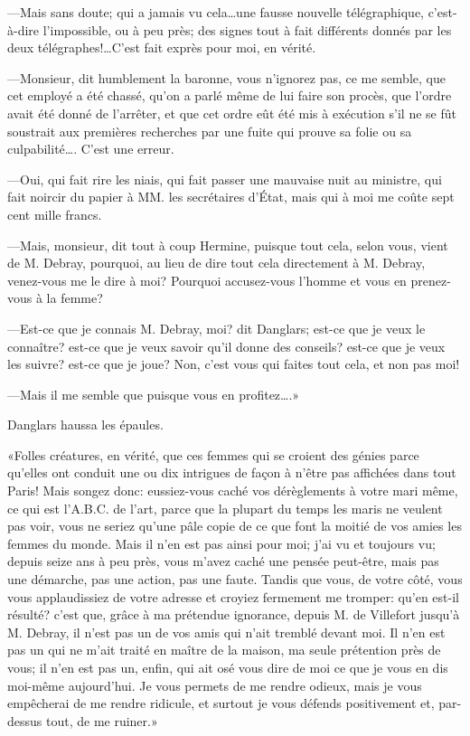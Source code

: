 —Mais sans doute; qui a jamais vu cela\dots une fausse nouvelle télégraphique, c'est-à-dire l'impossible, ou à peu près; des signes tout à fait différents donnés par les deux télégraphes!\dots C'est fait exprès pour moi, en vérité. 

—Monsieur, dit humblement la baronne, vous n'ignorez pas, ce me semble, que cet employé a été chassé, qu'on a parlé même de lui faire son procès, que l'ordre avait été donné de l'arrêter, et que cet ordre eût été mis à exécution s'il ne se fût soustrait aux premières recherches par une fuite qui prouve sa folie ou sa culpabilité\dots. C'est une erreur. 

—Oui, qui fait rire les niais, qui fait passer une mauvaise nuit au ministre, qui fait noircir du papier à MM. les secrétaires d'État, mais qui à moi me coûte sept cent mille francs. 

—Mais, monsieur, dit tout à coup Hermine, puisque tout cela, selon vous, vient de M. Debray, pourquoi, au lieu de dire tout cela directement à M. Debray, venez-vous me le dire à moi? Pourquoi accusez-vous l'homme et vous en prenez-vous à la femme? 

—Est-ce que je connais M. Debray, moi? dit Danglars; est-ce que je veux le connaître? est-ce que je veux savoir qu'il donne des conseils? est-ce que je veux les suivre? est-ce que je joue? Non, c'est vous qui faites tout cela, et non pas moi! 

—Mais il me semble que puisque vous en profitez\dots.» 

Danglars haussa les épaules. 

«Folles créatures, en vérité, que ces femmes qui se croient des génies parce qu'elles ont conduit une ou dix intrigues de façon à n'être pas affichées dans tout Paris! Mais songez donc: eussiez-vous caché vos dérèglements à votre mari même, ce qui est l'A.B.C. de l'art, parce que la plupart du temps les maris ne veulent pas voir, vous ne seriez qu'une pâle copie de ce que font la moitié de vos amies les femmes du monde. Mais il n'en est pas ainsi pour moi; j'ai vu et toujours vu; depuis seize ans à peu près, vous m'avez caché une pensée peut-être, mais pas une démarche, pas une action, pas une faute. Tandis que vous, de votre côté, vous vous applaudissiez de votre adresse et croyiez fermement me tromper: qu'en est-il résulté? c'est que, grâce à ma prétendue ignorance, depuis M. de Villefort jusqu'à M. Debray, il n'est pas un de vos amis qui n'ait tremblé devant moi. Il n'en est pas un qui ne m'ait traité en maître de la maison, ma seule prétention près de vous; il n'en est pas un, enfin, qui ait osé vous dire de moi ce que je vous en dis moi-même aujourd'hui. Je vous permets de me rendre odieux, mais je vous empêcherai de me rendre ridicule, et surtout je vous défends positivement et, par-dessus tout, de me ruiner.» 


